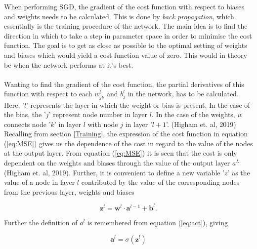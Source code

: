 \documentclass{article}
\begin{document}
\hfill \break

\noindent When performing SGD, the gradient of the cost function with respect to biases and weights needs to be calculated. This is done by \textit{back propagation}, which essentially is the training procedure of the network. The main idea is to find the direction in which to take a step in parameter space in order to minimise the cost function. The goal is to get as close as possible to the optimal setting of weights and biases which would yield a cost function value of zero. This would in theory be when the network performs at it's best.\\\\
\noindent Wanting to find the gradient of the cost function, the partial derivatives of this function with respect to each $w^{l}_{jk}$ and $b^{l}_j$ in the network, has to be calculated. Here, '$l$' represents the layer in which the weight or bias is present. In the case of the bias, the '$j$' represent node number in layer $l$. In the case of the weights, $w$ connects node '$k$' in layer $l$ with node $j$ in layer '$l + 1$'. (Higham et. al, 2019)\\

\noindent Recalling from section \ref{Training}, the expression of the cost function in equation (\ref{eq:MSE}) gives us the dependence of the cost in regard to the value of the nodes at the output layer. From equation (\ref{eq:MSE}) it is seen that the cost is only dependent on the weights and biases through the value of the output layer $a^L$ (Higham et. al, 2019). Further, it is convenient to define a new variable '$z$' as the value of a node in layer $l$ contributed by the value of the corresponding nodes from the previous layer, weights and biases

\begin{equation}
    \mathbf{z}^l = \mathbf{w}^l\cdot\mathbf{a}^{l-1} + \mathbf{b}^l.
\end{equation}

\noindent Further the definition of $a^l$ is remembered from  equation (\ref{eq:act}), giving

\begin{equation}
    \mathbf{a}^l = \sigma(\mathbf{z}^l)
\end{equation}
\end{document}
